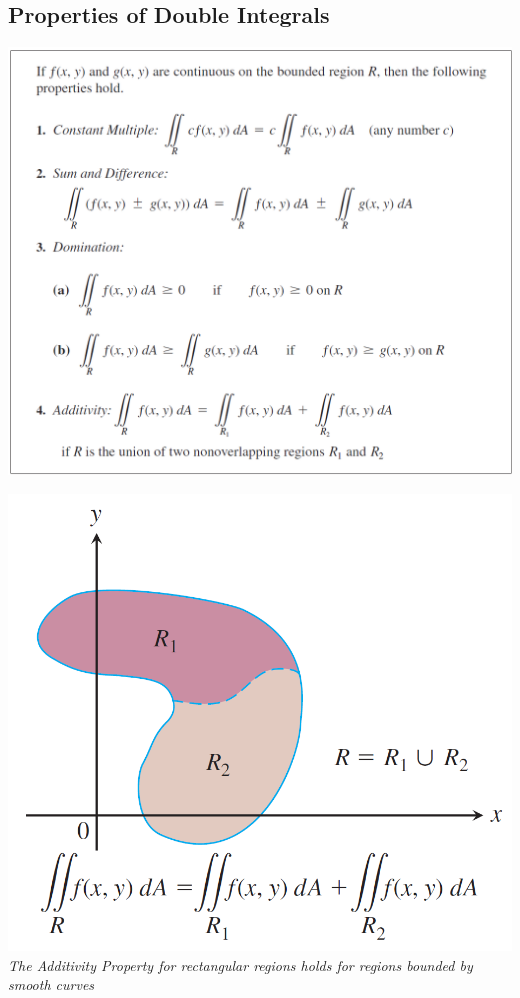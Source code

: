 \documentclass{article}
\begin{document}
\subsection{Properties of Double Integrals}
\begin{center}
    \includegraphics[width=1\linewidth]{prop.png}
\end{center}
\begin{center}
    \includegraphics[width=0.5\linewidth]{propadd.png}\\
    \textit{The Additivity Property
for rectangular regions holds for regions
bounded by smooth curves}
\end{center}
\end{document}
